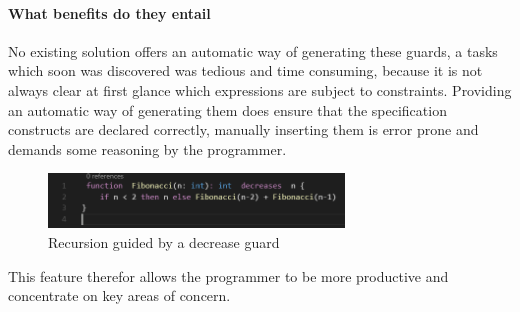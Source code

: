 \paragraph{What benefits do they entail}
No existing solution offers an automatic way of generating these guards, a tasks which soon was discovered was tedious and time consuming, because it is not always clear at first glance which expressions are subject to constraints. Providing an automatic way of generating them does ensure that the specification constructs are declared correctly, manually inserting them is error prone and demands some reasoning by the programmer.  \newline
\begin{figure}[H]
	\centering
	\includegraphics[width=0.7\textwidth]{img/decreaseGuardApplied}
	\caption{Recursion guided by a decrease guard}
	\label{fig:dfdecreaseguardapplied}
\end{figure}
This feature therefor allows the programmer to be more productive and concentrate on key areas of concern.


